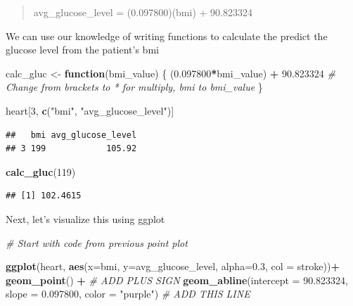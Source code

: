 \documentclass[
]{book}
\newenvironment{Shaded}{\begin{snugshade}}{\end{snugshade}}
\newcommand{\AttributeTok}[1]{\textcolor[rgb]{0.13,0.29,0.53}{#1}}
\newcommand{\CommentTok}[1]{\textcolor[rgb]{0.56,0.35,0.01}{\textit{#1}}}
\newcommand{\ControlFlowTok}[1]{\textcolor[rgb]{0.13,0.29,0.53}{\textbf{#1}}}
\newcommand{\DecValTok}[1]{\textcolor[rgb]{0.00,0.00,0.81}{#1}}
\newcommand{\FloatTok}[1]{\textcolor[rgb]{0.00,0.00,0.81}{#1}}
\newcommand{\FunctionTok}[1]{\textcolor[rgb]{0.13,0.29,0.53}{\textbf{#1}}}
\newcommand{\NormalTok}[1]{#1}
\newcommand{\OtherTok}[1]{\textcolor[rgb]{0.56,0.35,0.01}{#1}}
\newcommand{\SpecialCharTok}[1]{\textcolor[rgb]{0.81,0.36,0.00}{\textbf{#1}}}
\newcommand{\StringTok}[1]{\textcolor[rgb]{0.31,0.60,0.02}{#1}}
\begin{document}
\begin{quote}
avg\_glucose\_level = (0.097800)(bmi) + 90.823324
\end{quote}

We can use our knowledge of writing functions to calculate the predict the glucose level from the patient's bmi

\begin{Shaded}
\begin{Highlighting}[]
\NormalTok{calc\_gluc }\OtherTok{\textless{}{-}} \ControlFlowTok{function}\NormalTok{(bmi\_value) \{}
\NormalTok{  (}\FloatTok{0.097800}\SpecialCharTok{*}\NormalTok{bmi\_value) }\SpecialCharTok{+} \FloatTok{90.823324} \CommentTok{\# Change from brackets to * for multiply, bmi to bmi\_value}
\NormalTok{\}}

\NormalTok{heart[}\DecValTok{3}\NormalTok{, }\FunctionTok{c}\NormalTok{(}\StringTok{"bmi"}\NormalTok{, }\StringTok{"avg\_glucose\_level"}\NormalTok{)]}
\end{Highlighting}
\end{Shaded}

\begin{verbatim}
##   bmi avg_glucose_level
## 3 199            105.92
\end{verbatim}

\begin{Shaded}
\begin{Highlighting}[]
\FunctionTok{calc\_gluc}\NormalTok{(}\DecValTok{119}\NormalTok{)}
\end{Highlighting}
\end{Shaded}

\begin{verbatim}
## [1] 102.4615
\end{verbatim}

Next, let's visualize this using ggplot

\begin{Shaded}
\begin{Highlighting}[]
\CommentTok{\# Start with code from previous point plot }

\FunctionTok{ggplot}\NormalTok{(heart, }\FunctionTok{aes}\NormalTok{(}\AttributeTok{x=}\NormalTok{bmi, }\AttributeTok{y=}\NormalTok{avg\_glucose\_level, }\AttributeTok{alpha=}\FloatTok{0.3}\NormalTok{, }\AttributeTok{col =}\NormalTok{ stroke))}\SpecialCharTok{+}
  \FunctionTok{geom\_point}\NormalTok{() }\SpecialCharTok{+} \CommentTok{\# ADD PLUS SIGN}
  \FunctionTok{geom\_abline}\NormalTok{(}\AttributeTok{intercept =} \FloatTok{90.823324}\NormalTok{, }\AttributeTok{slope =} \FloatTok{0.097800}\NormalTok{, }\AttributeTok{color =} \StringTok{"purple"}\NormalTok{) }\CommentTok{\# ADD THIS LINE}
\end{Highlighting}
\end{Shaded}
\end{document}

